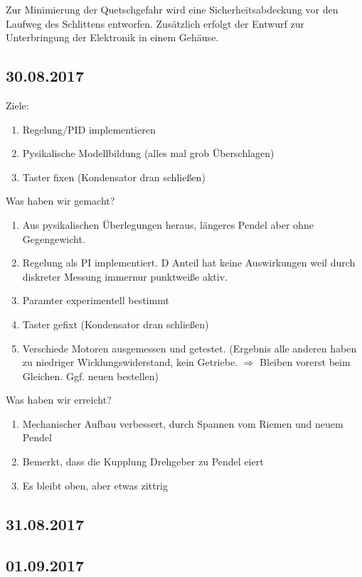 \documentclass[fontsize=12pt,a4paper,parskip]{scrartcl}
\begin{document}
Zur Minimierung der Quetschgefahr wird eine Sicherheitsabdeckung vor den Laufweg des Schlittens entworfen. Zusätzlich erfolgt der Entwurf zur Unterbringung der Elektronik in einem Gehäuse.



\subsection*{30.08.2017}
Ziele:
\begin{enumerate}
       \item Regelung/PID implementieren
       \item Pysikalische Modellbildung (alles mal grob Überschlagen)
       \item Taster fixen (Kondensator dran schließen)
\end{enumerate}

Was haben wir gemacht?
\begin{enumerate}
        \item Aus pysikalischen Überlegungen heraus, längeres Pendel aber ohne Gegengewicht.
        \item Regelung als PI implementiert. D Anteil hat keine Auswirkungen weil durch diskreter Messung immernur punktweiße aktiv.
        \item Paramter experimentell bestimmt
        \item Taster gefixt (Kondensator dran schließen)
        \item Verschiede Motoren ausgemessen und getestet. (Ergebnis alle anderen haben zu niedriger Wicklungswiderstand, kein Getriebe. $\Rightarrow$ Bleiben vorerst beim Gleichen. Ggf. neuen bestellen)
\end{enumerate}

Was haben wir erreicht?
\begin{enumerate}
        \item Mechanischer Aufbau verbessert, durch Spannen vom Riemen und neuem Pendel
        \item Bemerkt, dass die Kupplung Drehgeber zu Pendel eiert
        \item Es bleibt oben, aber etwas zittrig
\end{enumerate}

\subsection*{31.08.2017}

\subsection*{01.09.2017}
\end{document}

